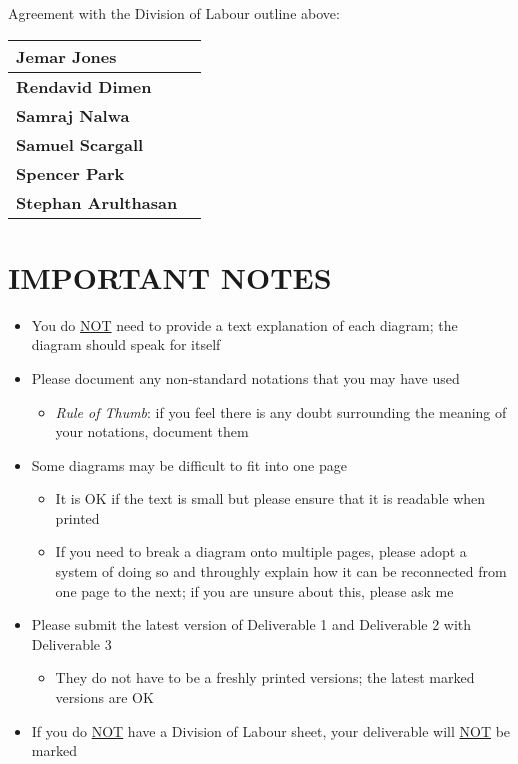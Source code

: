\documentclass[]{article}
\begin{document}
\noindent Agreement with the Division of Labour outline above:

\noindent\begin{tabularx}{\linewidth}{|l|X|}
	\hline
	\rule{0pt}{2em} \textbf{Jemar Jones} & \\
	\hline
	\rule{0pt}{2em} \textbf{Rendavid Dimen} & \\
	\hline
	\rule{0pt}{2em} \textbf{Samraj Nalwa} & \\
	\hline
	\rule{0pt}{2em} \textbf{Samuel Scargall} & \\
	\hline
	\rule{0pt}{2em} \textbf{Spencer Park} & \\
	\hline
	\rule{0pt}{2em} \textbf{Stephan Arulthasan} & \\
	\hline
\end{tabularx}

\newpage
\section*{IMPORTANT NOTES}
\begin{itemize}
	\item You do \underline{NOT} need to provide a text explanation of each diagram; the diagram should speak for itself
	\item Please document any non-standard notations that you may have used
	\begin{itemize}
		\item \emph{Rule of Thumb}: if you feel there is any doubt surrounding the meaning of your notations, document them
	\end{itemize}
	\item Some diagrams may be difficult to fit into one page
	\begin{itemize}
		\item It is OK if the text is small but please ensure that it is readable when printed
		\item If you need to break a diagram onto multiple pages, please adopt a system of doing so and throughly explain how it can be reconnected from one page to the next; if you are unsure about this, please ask me
	\end{itemize}
	\item Please submit the latest version of Deliverable 1 and Deliverable 2 with Deliverable 3
	\begin{itemize}
		\item They do not have to be a freshly printed versions; the latest marked versions are OK
	\end{itemize}
	\item If you do \underline{NOT} have a Division of Labour sheet, your deliverable will \underline{NOT} be marked
\end{itemize}
\end{document}
